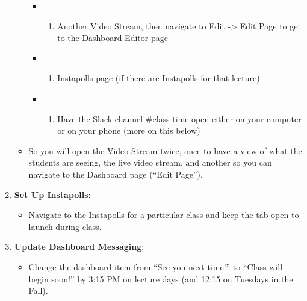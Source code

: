 \documentclass[
]{article}
\providecommand{\tightlist}{%
  \setlength{\itemsep}{0pt}\setlength{\parskip}{0pt}}
\begin{document}
\begin{enumerate}
\begin{itemize}
    \begin{itemize}
    \item
      \begin{enumerate}
      \def\labelenumii{\arabic{enumii})}
      \setcounter{enumii}{1}
      \tightlist
      \item
        Another Video Stream, then navigate to Edit -\textgreater{} Edit Page to get to the Dashboard Editor page\\
      \end{enumerate}
    \item
      \begin{enumerate}
      \def\labelenumii{\arabic{enumii})}
      \setcounter{enumii}{2}
      \tightlist
      \item
        Instapolls page (if there are Instapolls for that lecture)\\
      \end{enumerate}
    \item
      \begin{enumerate}
      \def\labelenumii{\arabic{enumii})}
      \setcounter{enumii}{3}
      \tightlist
      \item
        Have the Slack channel \#class-time open either on your computer or on your phone (more on this below)
      \end{enumerate}
    \end{itemize}
  \item
    So you will open the Video Stream twice, once to have a view of what the students are seeing, the live video stream, and another so you can navigate to the Dashboard page (``Edit Page'').
  \end{itemize}
\item
  \textbf{Set Up Instapolls}:

  \begin{itemize}
  \tightlist
  \item
    Navigate to the Instapolls for a particular class and keep the tab open to launch during class.\\
  \end{itemize}
\item
  \textbf{Update Dashboard Messaging}:

  \begin{itemize}
  \tightlist
  \item
    Change the dashboard item from ``See you next time!'' to ``Class will begin soon!'' by 3:15 PM on lecture days (and 12:15 on Tuesdays in the Fall).
  \end{itemize}
\end{enumerate}
\end{document}

